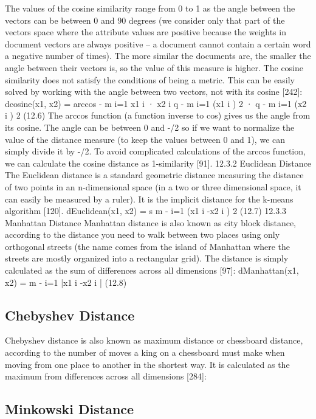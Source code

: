 \documentclass[11pt,openany,executivepaper]{book}
\begin{document}
The values of the cosine similarity range from 0 to 1 as the angle between the
vectors can be between 0 and 90 degrees (we consider only that part of the vectors
space where the attribute values are positive because the weights in document
vectors are always positive – a document cannot contain a certain word a negative
number of times). The more similar the documents are, the smaller the angle
between their vectors is, so the value of this measure is higher.
The cosine similarity does not satisfy the conditions of being a metric. This
can be easily solved by working with the angle between two vectors, not with its
cosine [242]:
dcosine(x1, x2) = arccos
-
m
i=1
x1
i
· x2
i
q
-
m
i=1
(x1
i
)
2
·
q -
m
i=1
(x2
i
)
2
(12.6)
The arccos function (a function inverse to cos) gives us the angle from its
cosine. The angle can be between 0 and -/2 so if we want to normalize the value
of the distance measure (to keep the values between 0 and 1), we can simply
divide it by -/2. To avoid complicated calculations of the arccos function, we
can calculate the cosine distance as 1-similarity [91].
12.3.2 Euclidean Distance
The Euclidean distance is a standard geometric distance measuring the distance
of two points in an n-dimensional space (in a two or three dimensional space,
it can easily be measured by a ruler). It is the implicit distance for the k-means
algorithm [120].
dEuclidean(x1, x2) = s
m
-
i=1
(x1
i -x2
i
)
2
(12.7)
12.3.3 Manhattan Distance
Manhattan distance is also known as city block distance, according to the distance you need to walk between two places using only orthogonal streets (the
name comes from the island of Manhattan where the streets are mostly organized into a rectangular grid). The distance is simply calculated as the sum of
differences across all dimensions [97]:
dManhattan(x1, x2) =
m
-
i=1
|x1
i -x2
i
| (12.8)

\subsection{Chebyshev Distance}

Chebyshev distance is also known as maximum distance or chessboard distance,
according to the number of moves a king on a chessboard must make when moving from one place to another in the shortest way. It is calculated as the maximum
from differences across all dimensions [284]:

\subsection{Minkowski Distance}
\end{document}
